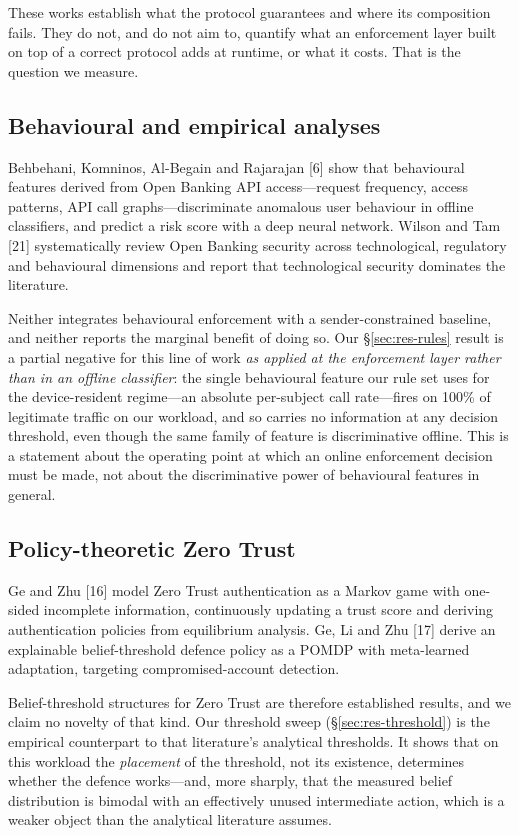 These works establish what the protocol guarantees and where its composition fails. They do not, and do not aim to, quantify what an enforcement layer built on top of a correct protocol adds at runtime, or what it costs. That is the question we measure.

\subsection{Behavioural and empirical analyses}

Behbehani, Komninos, Al-Begain and Rajarajan [6] show that behavioural features derived from Open Banking API access---request frequency, access patterns, API call graphs---discriminate anomalous user behaviour in offline classifiers, and predict a risk score with a deep neural network. Wilson and Tam [21] systematically review Open Banking security across technological, regulatory and behavioural dimensions and report that technological security dominates the literature.

Neither integrates behavioural enforcement with a sender-constrained baseline, and neither reports the marginal benefit of doing so. Our \S\ref{sec:res-rules} result is a partial negative for this line of work \textit{as applied at the enforcement layer rather than in an offline classifier}: the single behavioural feature our rule set uses for the device-resident regime---an absolute per-subject call rate---fires on 100\% of legitimate traffic on our workload, and so carries no information at any decision threshold, even though the same family of feature is discriminative offline. This is a statement about the operating point at which an online enforcement decision must be made, not about the discriminative power of behavioural features in general.

\subsection{Policy-theoretic Zero Trust}

Ge and Zhu [16] model Zero Trust authentication as a Markov game with one-sided incomplete information, continuously updating a trust score and deriving authentication policies from equilibrium analysis. Ge, Li and Zhu [17] derive an explainable belief-threshold defence policy as a POMDP with meta-learned adaptation, targeting compromised-account detection.

Belief-threshold structures for Zero Trust are therefore established results, and we claim no novelty of that kind. Our threshold sweep (\S\ref{sec:res-threshold}) is the empirical counterpart to that literature's analytical thresholds. It shows that on this workload the \textit{placement} of the threshold, not its existence, determines whether the defence works---and, more sharply, that the measured belief distribution is bimodal with an effectively unused intermediate action, which is a weaker object than the analytical literature assumes.

